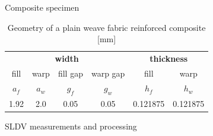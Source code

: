 \documentclass[10pt]{beamer} %
\begin{document}
\begin{frame}[t,label=frame12]{Composite specimen}
\begin{table}[h]
	\renewcommand{\arraystretch}{1.1}
	\centering \footnotesize
	\caption{Geometry of a plain weave fabric reinforced composite [mm]}
	\begin{tabular}{cccccc} 
		\toprule
		\multicolumn{4}{c}{\textbf{width} }	& \multicolumn{2}{c}{\textbf{thickness} }  \\ 
		\cmidrule(lr){1-4} \cmidrule(lr){5-6} 
		fill & warp & fill gap& warp gap& fill & warp\\
		$a_f$ &$a_w$& $g_f$  & $g_w$  & $h_f$& $h_w$ \\ 
		\cmidrule(lr){1-2} \cmidrule(lr){3-4} \cmidrule(lr){5-6}
		1.92 &2.0& 0.05& 0.05 & 0.121875 & 0.121875 \\
		\bottomrule 
	\end{tabular} 
	\label{tab:weave_geo}
\end{table}
\end{frame}
\begin{frame}[t,label=frame13]{SLDV measurements and processing}
	\begin{figure}
	\end{figure}
\end{frame}
\end{document}
